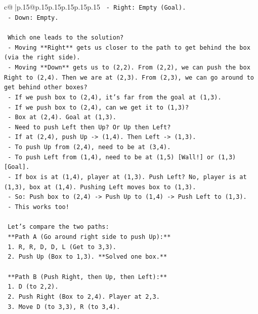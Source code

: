 \documentclass{article}
\begin{document}
{\begin{supertabular}{c@{$\;$}|p{.15\linewidth}@{}p{.15\linewidth}p{.15\linewidth}p{.15\linewidth}p{.15\linewidth}p{.15\linewidth}}
{{{\texttt{   {-} Right: Empty (Goal).} \\
\texttt{   {-} Down: Empty.} \\
\\ 
\texttt{   Which one leads to the solution?} \\
\texttt{   {-} Moving **Right** gets us closer to the path to get behind the box (via the right side).} \\
\texttt{   {-} Moving **Down** gets us to (2,2). From (2,2), we can push the box Right to (2,4). Then we are at (2,3). From (2,3), we can go around to get behind other boxes?} \\
\texttt{     {-} If we push box to (2,4), it's far from the goal at (1,3).} \\
\texttt{     {-} If we push box to (2,4), can we get it to (1,3)?} \\
\texttt{       {-} Box at (2,4). Goal at (1,3).} \\
\texttt{       {-} Need to push Left then Up? Or Up then Left?} \\
\texttt{       {-} If at (2,4), push Up {-}> (1,4). Then Left {-}> (1,3).} \\
\texttt{       {-} To push Up from (2,4), need to be at (3,4).} \\
\texttt{       {-} To push Left from (1,4), need to be at (1,5) {[}Wall!{]} or (1,3) {[}Goal{]}.} \\
\texttt{       {-} If box is at (1,4), player at (1,3). Push Left? No, player is at (1,3), box at (1,4). Pushing Left moves box to (1,3).} \\
\texttt{       {-} So: Push box to (2,4) {-}> Push Up to (1,4) {-}> Push Left to (1,3).} \\
\texttt{       {-} This works too!} \\
\\ 
\texttt{   Let's compare the two paths:} \\
\texttt{   **Path A (Go around right side to push Up):**} \\
\texttt{   1. R, R, D, D, L (Get to 3,3).} \\
\texttt{   2. Push Up (Box to 1,3). **Solved one box.**} \\
\\ 
\texttt{   **Path B (Push Right, then Up, then Left):**} \\
\texttt{   1. D (to 2,2).} \\
\texttt{   2. Push Right (Box to 2,4). Player at 2,3.} \\
\texttt{   3. Move D (to 3,3), R (to 3,4).} \\
}}}
\end{supertabular}}
\end{document}
